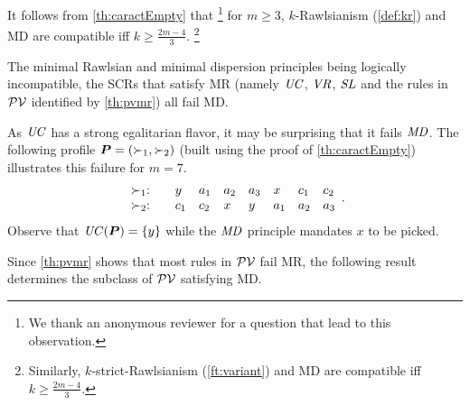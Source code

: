 \documentclass[pagesize, twoside=off, bibliography=totoc, DIV=calc, fontsize=12pt, a4paper]{scrartcl}
\begin{document}
\begin{remark}
  It follows from \cref{th:caractEmpty} that%
  \footnote{We thank an anonymous reviewer for a question that lead to this observation.} 
  for $m ≥ 3$, $k$-Rawlsianism (\cref{def:kr}) and MD are compatible iff $k \geq \frac{2m - 4}{3}$.%
  \footnote{Similarly, $k$-strict-Rawlsianism (\cref{ft:variant}) and MD are compatible iff $k \geq \frac{2m - 4}{3}$.}
\end{remark}

The minimal Rawlsian and minimal dispersion principles being logically incompatible, the SCRs that satisfy MR (namely $\mathit{UC}$, $\mathit{VR}$, $\mathit{SL}$ and the rules in $\mathcal{PV}$ identified by \cref{th:pvmr}) all fail MD.

\begin{remark}
  As $\mathit{UC}$ has a strong egalitarian flavor, it may be surprising that it fails $\mathit{MD}$. The following profile $\bm{P} = (\succ_1, \succ_2)$ (built using the proof of \cref{th:caractEmpty}) illustrates this failure for $m = 7$.
  \begin{equation}
    \begin{array}{l @{:\hskip 2em} *7{l}}
      \pref_1 & y   & a_1 & a_2 & a_3 & x   & c_1 & c_2 \\
      \pref_2 & c_1 & c_2 & x   & y   & a_1 & a_2 & a_3 \\
    \end{array}.
  \end{equation}
  Observe that $\mathit{UC}(\bm{P}) = \{y\}$ while the $\mathit{MD}$ principle mandates $x$ to be picked.
\end{remark}

Since \cref{th:pvmr} shows that most rules in $\mathcal{PV}$ fail MR, the following result determines the subclass of $\mathcal{PV}$ satisfying MD.
\end{document}
